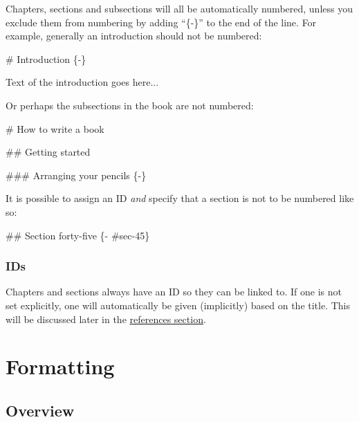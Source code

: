 \documentclass[
]{book}
\newenvironment{Shaded}{\begin{snugshade}}{\end{snugshade}}
\newcommand{\FunctionTok}[1]{\textcolor[rgb]{0.00,0.00,0.00}{#1}}
\newcommand{\NormalTok}[1]{#1}
\begin{document}
Chapters, sections and subsections will all be automatically numbered, unless you exclude them from numbering by adding ``\{-\}'' to the end of the line. For example, generally an introduction should not be numbered:

\begin{Shaded}
\begin{Highlighting}[]
\FunctionTok{\# Introduction \{{-}\}}

\NormalTok{Text of the introduction goes here...}
\end{Highlighting}
\end{Shaded}

Or perhaps the subsections in the book are not numbered:

\begin{Shaded}
\begin{Highlighting}[]
\FunctionTok{\# How to write a book}

\FunctionTok{\#\# Getting started}

\FunctionTok{\#\#\# Arranging your pencils \{{-}\}}
\end{Highlighting}
\end{Shaded}

It is possible to assign an ID \emph{and} specify that a section is not to be numbered like so:

\begin{Shaded}
\begin{Highlighting}[]
\FunctionTok{\#\# Section forty{-}five \{{-} \#sec{-}45\}}
\end{Highlighting}
\end{Shaded}

\hypertarget{ids}{%
\subsection{IDs}\label{ids}}

Chapters and sections always have an ID so they can be linked to. If one is not set explicitly, one will automatically be given (implicitly) based on the title. This will be discussed later in the \protect\hyperlink{references}{references section}.

\hypertarget{formatting}{%
\chapter{Formatting}\label{formatting}}

\hypertarget{overview}{%
\section{Overview}\label{overview}}
\end{document}
